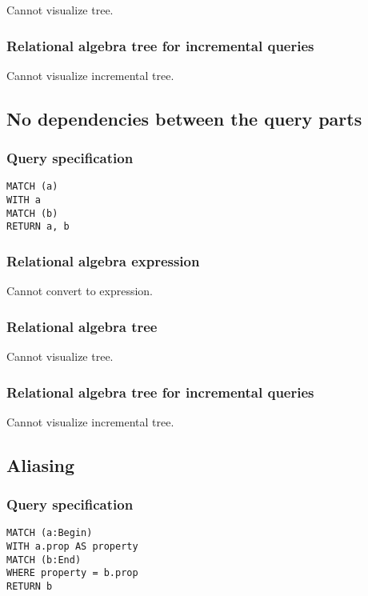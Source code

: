 Cannot visualize tree.

\subsubsection*{Relational algebra tree for incremental queries}

Cannot visualize incremental tree.

\subsection{No dependencies between the query parts}

\subsubsection*{Query specification}

\begin{lstlisting}
MATCH (a)
WITH a
MATCH (b)
RETURN a, b
\end{lstlisting}

\subsubsection*{Relational algebra expression}

Cannot convert to expression.

\subsubsection*{Relational algebra tree}

Cannot visualize tree.

\subsubsection*{Relational algebra tree for incremental queries}

Cannot visualize incremental tree.

\subsection{Aliasing}

\subsubsection*{Query specification}

\begin{lstlisting}
MATCH (a:Begin)
WITH a.prop AS property
MATCH (b:End)
WHERE property = b.prop
RETURN b
\end{lstlisting}

